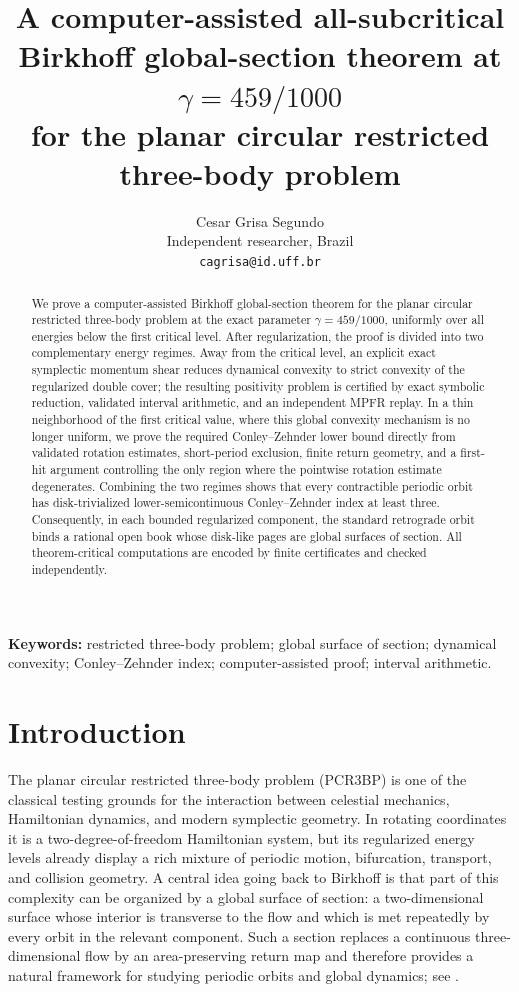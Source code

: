 \documentclass[11pt]{article}
\title{A computer-assisted all-subcritical Birkhoff global-section theorem at $\gamma=459/1000$\\for the planar circular restricted three-body problem}
\author{Cesar Grisa Segundo\\\small Independent researcher, Brazil\\\small \texttt{cagrisa@id.uff.br}}
\date{}
\begin{document}
\maketitle

\begin{abstract}
We prove a computer-assisted Birkhoff global-section theorem for the planar circular restricted three-body problem at the exact parameter $\gamma=459/1000$, uniformly over all energies below the first critical level. After regularization, the proof is divided into two complementary energy regimes. Away from the critical level, an explicit exact symplectic momentum shear reduces dynamical convexity to strict convexity of the regularized double cover; the resulting positivity problem is certified by exact symbolic reduction, validated interval arithmetic, and an independent MPFR replay. In a thin neighborhood of the first critical value, where this global convexity mechanism is no longer uniform, we prove the required Conley--Zehnder lower bound directly from validated rotation estimates, short-period exclusion, finite return geometry, and a first-hit argument controlling the only region where the pointwise rotation estimate degenerates. Combining the two regimes shows that every contractible periodic orbit has disk-trivialized lower-semicontinuous Conley--Zehnder index at least three. Consequently, in each bounded regularized component, the standard retrograde orbit binds a rational open book whose disk-like pages are global surfaces of section. All theorem-critical computations are encoded by finite certificates and checked independently.
\end{abstract}

\noindent\textbf{Keywords:} restricted three-body problem; global surface of section; dynamical convexity; Conley--Zehnder index; computer-assisted proof; interval arithmetic.

\section{Introduction}
The planar circular restricted three-body problem (PCR3BP) is one of the classical testing grounds for the interaction between celestial mechanics, Hamiltonian dynamics, and modern symplectic geometry. In rotating coordinates it is a two-degree-of-freedom Hamiltonian system, but its regularized energy levels already display a rich mixture of periodic motion, bifurcation, transport, and collision geometry. A central idea going back to Birkhoff is that part of this complexity can be organized by a global surface of section: a two-dimensional surface whose interior is transverse to the flow and which is met repeatedly by every orbit in the relevant component. Such a section replaces a continuous three-dimensional flow by an area-preserving return map and therefore provides a natural framework for studying periodic orbits and global dynamics; see \citet{Birkhoff1915}.
\end{document}
